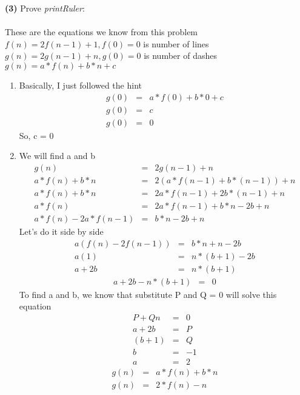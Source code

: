 \documentclass[a4paper, 11pt]{article}
\renewcommand{\part}[1] {\vspace{.10in} {\bf (#1)}}
\begin{document}
	\part{3} Prove {\em printRuler}: \\\\
	These are the equations we know from this problem\\
	$f(n)=2f(n-1)+1, f(0)=0$ is number of lines\\
	$g(n)=2g(n-1)+n, g(0)=0$ is number of dashes\\
	$g(n)=a*f(n)+b*n+c$
	\begin{enumerate}
		\item Basically, I just followed the hint
		\begin{eqnarray}
		g(0)&=&a*f(0)+b*0+c\\
		g(0)&=&c\\ 
		g(0)&=&0
		\end{eqnarray} 
		So, c = 0
		
		\item We will find a and b
		\begin{eqnarray}
		g(n)&=&2g(n-1)+n\\
  		a*f(n)+b*n&=&2(a*f(n-1)+b*(n-1))+n\\
  		a*f(n)+b*n&=&2a*f(n-1)+2b*(n-1)+n\\
  		a*f(n)&=&2a*f(n-1)+b*n-2b+n\\
  		a*f(n)-2a*f(n-1)&=&b*n-2b+n
		\end{eqnarray}
		Let's do it side by side
		\begin{eqnarray}  		
		a(f(n)-2f(n-1))&=&b*n+n-2b\\
		a(1)&=&n*(b+1)-2b\\
		a+2b&=&n*(b+1)
		\end{eqnarray}
		\begin{eqnarray}
		a+2b-n*(b+1)&=&0
		\end{eqnarray}
		To find a and b, we know that substitute P and Q = 0 will solve this equation
		\begin{eqnarray}
		P + Qn &=& 0\\
		a+2b&=&P\\
		(b+1)&=&Q\\
		b&=&-1\\
		a&=&2
		\end{eqnarray}
		\begin{eqnarray}
		g(n)&=&a*f(n)+b*n\\
		g(n)&=&2*f(n)-n
		\end{eqnarray}
		

\end{enumerate}
\end{document}
